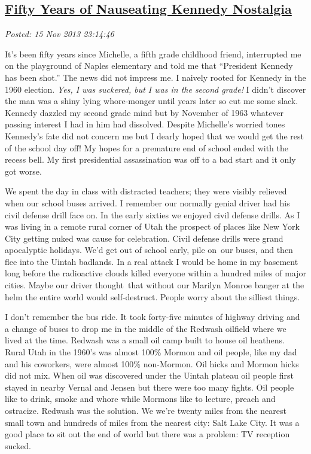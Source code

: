 %

\subsection*{\href{https://bakerjd99.wordpress.com/2013/11/15/fifty-years-of-nauseating-kennedy-nostalgia/}{Fifty Years of Nauseating Kennedy Nostalgia}}


\noindent\emph{Posted: 15 Nov 2013 23:14:46}
\vspace{6pt}

It's been fifty years since Michelle, a fifth grade childhood friend,
interrupted me on the playground of Naples elementary and told me that
``President Kennedy has been shot.'' The news did not impress me. I
naively rooted for Kennedy in the 1960 election. \emph{Yes, I was
suckered, but I was in the second grade!} I didn't discover the man was
a shiny lying whore-monger until years later so cut me some slack.
Kennedy dazzled my second grade mind but by November of 1963 whatever
passing interest I had in him had dissolved. Despite Michelle's worried
tones Kennedy's fate did not concern me but I dearly hoped that we would
get the rest of the school day off! My hopes for a premature end of
school ended with the recess bell. My first presidential assassination was
off to a bad start and it only got worse.

We spent the day in class with distracted teachers; they were visibly
relieved when our school buses arrived. I remember our normally genial
driver had his civil defense drill face on. In the early sixties we
enjoyed civil defense drills. As I was living in a remote rural corner
of Utah the prospect of places like New York City getting nuked was
cause for celebration. Civil defense drills were grand apocalyptic
holidays. We'd get out of school early, pile on~our buses, and then flee
into the Uintah badlands. In a real attack I would be home in my
basement long before the radioactive clouds killed everyone within a
hundred miles of major cities. Maybe our driver thought~that without our
Marilyn Monroe banger at the helm the entire world would self-destruct.
People worry about the silliest things.

I don't remember the bus ride. It took forty-five minutes of highway
driving and a change of buses to drop me in the middle of the Redwash
oilfield where we lived at the time. Redwash was a small oil camp built
to house oil heathens. Rural Utah in the 1960's was almost 100\% Mormon
and oil people, like my dad and his coworkers, were almost 100\%
non-Mormon. Oil hicks and Mormon hicks did not mix. When oil was
discovered under the Uintah plateau oil people first stayed in nearby
Vernal and Jensen but there were too many fights. Oil people like to
drink, smoke and whore while Mormons like to lecture, preach and
ostracize. Redwash was the solution. We we're twenty miles from the
nearest small town and hundreds of miles from the nearest city: Salt
Lake City. It was a good place to sit out the end of world but there was a
problem: TV reception sucked.

